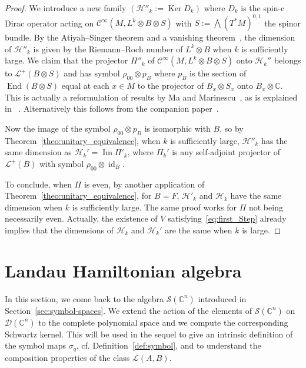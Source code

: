 \documentclass[10pt,a4paper]{article}
\theoremstyle{definition}
\numberwithin{equation}{section}
\newcommand{\C}{{\mathbb{C}}}
\newcommand{\si}{{\sigma}}
\newcommand{\op}{\operatorname}
\newcommand{\Ci}{{\mathcal{C}}^{\infty}}
\newcommand{\D}{\mathcal{D}}
\newcommand{\symb}{\mathcal{S}}
\newcommand{\lag}{\mathcal{L}}
\newcommand{\Hilb}{\mathcal{H}}
\newcommand{\Uu}{\rho}
\begin{document}
\begin{proof}
We introduce a new family $(\Hilb''_k:= \op{Ker} D_k)$ where $D_k$ is the spin-c Dirac operator acting on $\Ci (M, L^k \otimes B \otimes S)$ with  $S :=\bigwedge (T^*M)^{0,1} $  the spinor bundle. By the Atiyah--Singer theorem and a vanishing theorem~\cite{BoUr96,MaMa02}, the dimension of $\Hilb''_k$ is given by the Riemann--Roch number of $L^k \otimes B$ when $k$ is sufficiently large. We claim that the projector $\Pi''_k$ of $\Ci (M, L^k \otimes B \otimes S)$ onto $\Hilb_k''$ belongs to $\lag ^+ (B \otimes S)$ and has symbol $\Uu_{00}
\otimes p_B$ where $p_B $ is the section of $\op{End} (B \otimes S)$ equal at each $x\in M$ to the projector of $B_x \otimes S_x$ onto $B_x \otimes
\C$. This is actually a reformulation of results by Ma and Marinescu~\cite{MaMa}, as is explained in ~\cite[Appendix A]{oim}.  Alternatively this follows from the companion paper~\cite{oim_copain}.

Now the image of the symbol $\rho_{00} \otimes p_B$ is isomorphic with $B$, so by Theorem~\ref{theo:unitary_equivalence}, when $k$ is sufficiently large, $\Hilb''_k$ has the same dimension as $\Hilb_k' = \op{Im} \Pi'_k$, where $\Pi_k'$ is any self-adjoint projector of $\lag^+(B)$ with symbol $ \rho_{00} \otimes \op{id}_B$.

To conclude, when $\Pi$ is even, by another application of Theorem~\ref{theo:unitary_equivalence}, for $B=F$, $\Hilb'_k$ and $\Hilb_k$ have the same dimension when $k$ is sufficiently large.  The same proof works for $\Pi$ not being necessarily even. Actually, the existence of $V$ satisfying~\eqref{eq:first_Step} already implies that the dimensions of $\Hilb_k$ and $\Hilb_k'$ are the same when $k$ is large. 
\end{proof}



\section{Landau Hamiltonian algebra} \label{sec:landau-levels-cn}

In this section, we come back to the algebra $\symb (\C^n)$ introduced in Section~\ref{sec:symbol-spaces}. We extend the action of the elements of $\symb (\C^n)$ on $\D (\C^n)$ to the complete polynomial space and we compute the corresponding Schwartz kernel. This will be used in the sequel to give an intrinsic definition of the symbol maps $\si_q$, cf. Definition~\ref{def:symbol}, and to understand the composition properties of the class $\lag (A,B)$.
\end{document}
